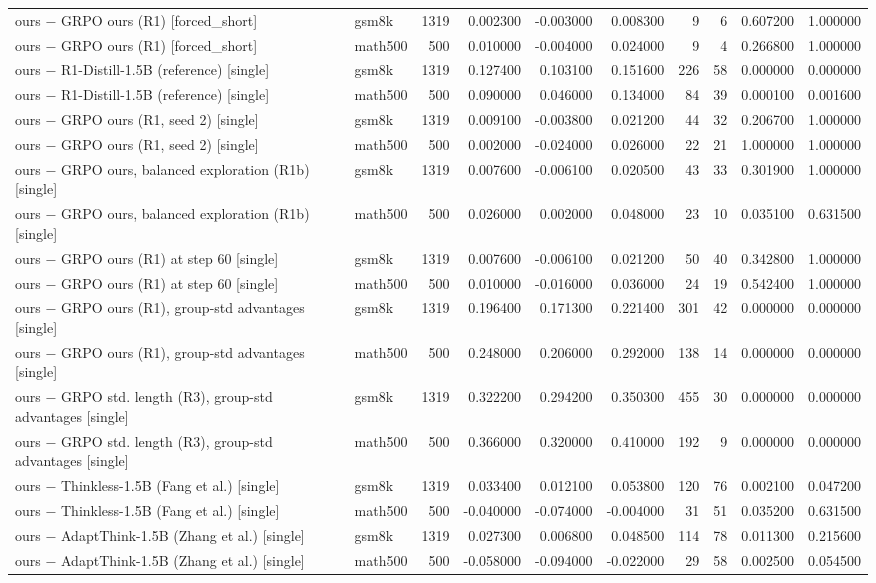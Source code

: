 \begin{table}
\begin{tabular}{llrrrrrrrr}
ours − GRPO ours (R1) [forced_short] & gsm8k & 1319 & 0.002300 & -0.003000 & 0.008300 & 9 & 6 & 0.607200 & 1.000000 \\
ours − GRPO ours (R1) [forced_short] & math500 & 500 & 0.010000 & -0.004000 & 0.024000 & 9 & 4 & 0.266800 & 1.000000 \\
ours − R1-Distill-1.5B (reference) [single] & gsm8k & 1319 & 0.127400 & 0.103100 & 0.151600 & 226 & 58 & 0.000000 & 0.000000 \\
ours − R1-Distill-1.5B (reference) [single] & math500 & 500 & 0.090000 & 0.046000 & 0.134000 & 84 & 39 & 0.000100 & 0.001600 \\
ours − GRPO ours (R1, seed 2) [single] & gsm8k & 1319 & 0.009100 & -0.003800 & 0.021200 & 44 & 32 & 0.206700 & 1.000000 \\
ours − GRPO ours (R1, seed 2) [single] & math500 & 500 & 0.002000 & -0.024000 & 0.026000 & 22 & 21 & 1.000000 & 1.000000 \\
ours − GRPO ours, balanced exploration (R1b) [single] & gsm8k & 1319 & 0.007600 & -0.006100 & 0.020500 & 43 & 33 & 0.301900 & 1.000000 \\
ours − GRPO ours, balanced exploration (R1b) [single] & math500 & 500 & 0.026000 & 0.002000 & 0.048000 & 23 & 10 & 0.035100 & 0.631500 \\
ours − GRPO ours (R1) at step 60 [single] & gsm8k & 1319 & 0.007600 & -0.006100 & 0.021200 & 50 & 40 & 0.342800 & 1.000000 \\
ours − GRPO ours (R1) at step 60 [single] & math500 & 500 & 0.010000 & -0.016000 & 0.036000 & 24 & 19 & 0.542400 & 1.000000 \\
ours − GRPO ours (R1), group-std advantages [single] & gsm8k & 1319 & 0.196400 & 0.171300 & 0.221400 & 301 & 42 & 0.000000 & 0.000000 \\
ours − GRPO ours (R1), group-std advantages [single] & math500 & 500 & 0.248000 & 0.206000 & 0.292000 & 138 & 14 & 0.000000 & 0.000000 \\
ours − GRPO std. length (R3), group-std advantages [single] & gsm8k & 1319 & 0.322200 & 0.294200 & 0.350300 & 455 & 30 & 0.000000 & 0.000000 \\
ours − GRPO std. length (R3), group-std advantages [single] & math500 & 500 & 0.366000 & 0.320000 & 0.410000 & 192 & 9 & 0.000000 & 0.000000 \\
ours − Thinkless-1.5B (Fang et al.) [single] & gsm8k & 1319 & 0.033400 & 0.012100 & 0.053800 & 120 & 76 & 0.002100 & 0.047200 \\
ours − Thinkless-1.5B (Fang et al.) [single] & math500 & 500 & -0.040000 & -0.074000 & -0.004000 & 31 & 51 & 0.035200 & 0.631500 \\
ours − AdaptThink-1.5B (Zhang et al.) [single] & gsm8k & 1319 & 0.027300 & 0.006800 & 0.048500 & 114 & 78 & 0.011300 & 0.215600 \\
ours − AdaptThink-1.5B (Zhang et al.) [single] & math500 & 500 & -0.058000 & -0.094000 & -0.022000 & 29 & 58 & 0.002500 & 0.054500 \\
\bottomrule
\end{tabular}
\end{table}
